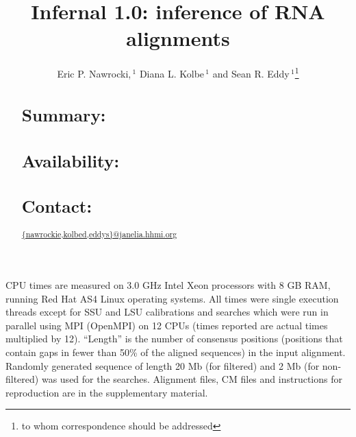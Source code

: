 \documentclass{bioinfo}
\begin{document}

\begin{application}

\title[Infernal 1.0]{Infernal 1.0: inference of RNA alignments}
\author[E. Nawrocki, D. Kolbe and S. Eddy]{Eric P. Nawrocki,\,$^1$ Diana L. Kolbe\,$^1$ and Sean R. Eddy\,$^1$\footnote{to whom correspondence should be addressed}}
\address{$^{1}$HHMI Janelia Farm Research Campus, Ashburn VA 20147, USA\\}



\maketitle

\begin{abstract}
\section{Summary:}

\section{Availability:}

\section{Contact:} \url{{nawrockie,kolbed,eddys}@janelia.hhmi.org}
\end{abstract}







\begin{table}[!t]
%
{}{CPU times are measured on 3.0 GHz Intel Xeon processors with 8 GB
RAM, running Red Hat AS4 Linux operating systems. All times were
single execution threads except for SSU and LSU calibrations and
searches which were run in parallel using MPI (OpenMPI)
on 12 CPUs (times reported are actual times multiplied by 12).
``Length'' is the number of consensus positions (positions that
contain gaps in fewer than 50\% of the aligned sequences) in the input
alignment.  Randomly generated sequence of length 20 Mb (for filtered)
and 2 Mb (for non-filtered) was used for the searches. Alignment
files, CM files and instructions for reproduction are in the
supplementary material.}
\end{table}


\end{application}
\end{document}
